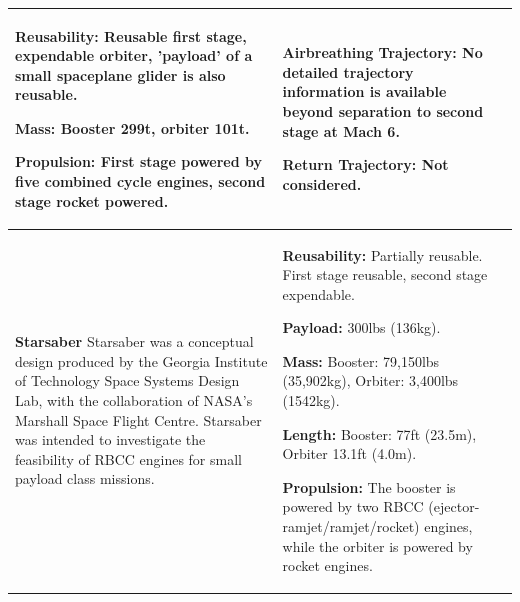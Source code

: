 {\begin{landscape}
\begin{xltabular}{\linewidth}{|X|X|X|}
\textbf{Reusability:} Reusable first stage, expendable orbiter, 'payload' of a small spaceplane glider is also reusable. 

\textbf{Mass:} Booster 299t, orbiter 101t. 

\textbf{Propulsion:} First stage powered by five combined cycle engines, second stage rocket powered. 
	
	&\small
	\textbf{Airbreathing Trajectory:} No detailed trajectory information is available beyond separation to second stage at Mach 6. 
	
	\textbf{Return Trajectory:} Not considered. 
	\\
	\hline \small 
	\textbf{Starsaber}\cite{Germain2001}\newline\newline
	Starsaber was a conceptual design produced by the Georgia Institute of Technology Space Systems Design Lab, with the collaboration of NASA's Marshall Space Flight Centre. Starsaber was intended to investigate the feasibility of RBCC engines for small payload class missions. 
	&\small
	
	\textbf{Reusability:} Partially reusable. First stage reusable, second stage expendable. 
	
	\textbf{Payload:} 300lbs (136kg). 
	
	\textbf{Mass:} Booster: 79,150lbs (35,902kg), Orbiter: 3,400lbs (1542kg). 
	
	\textbf{Length:} Booster: 77ft (23.5m), Orbiter 13.1ft (4.0m).
	
	\textbf{Propulsion:} The booster is powered by two RBCC (ejector-ramjet/ramjet/rocket) engines, while the orbiter is powered by rocket engines.  
	

\end{xltabular}
\end{landscape}}
